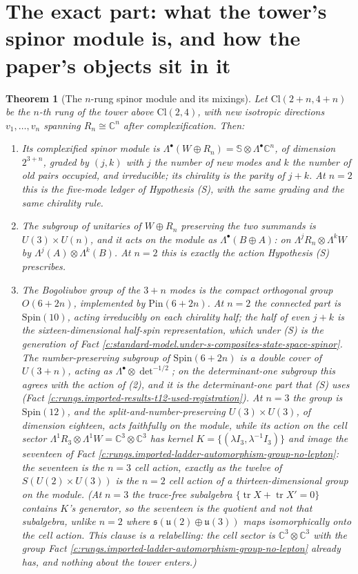 \documentclass[11pt]{article}
\newtheorem{theorem}{Theorem}[section]
\theoremstyle{definition}
\theoremstyle{plain}
\providecommand{\C}{}\renewcommand{\C}{\mathbb{C}}
\providecommand{\Cl}{}\renewcommand{\Cl}{\mathrm{Cl}}
\providecommand{\Sp}{}\renewcommand{\Sp}{\mathbb{S}}
\providecommand{\tr}{}\renewcommand{\tr}{\operatorname{tr}}
\providecommand{\uu}{}\renewcommand{\uu}{\mathfrak{u}}
\begin{document}
\section{The exact part: what the tower's spinor module is, and how the paper's objects sit in it}

\begin{theorem}[The $n$-rung spinor module and its mixings]\label{c:rungs.rung-spinor-module-mixings}
Let $\Cl(2{+}n, 4{+}n)$ be the $n$-th rung of the tower above $\Cl(2,4)$, with new isotropic directions $v_{1}, \ldots, v_{n}$ spanning $R_{n} \cong \C^{n}$ after complexification. Then:
\begin{enumerate}
\item Its complexified spinor module is $\Lambda^{\bullet}(W \oplus R_{n}) = \Sp \otimes \Lambda^{\bullet}\C^{n}$, of dimension $2^{3+n}$, graded by $(j, k)$ with $j$ the number of new modes and $k$ the number of old pairs occupied, and irreducible; its chirality is the parity of $j + k$. At $n = 2$ this is the five-mode ledger of Hypothesis (S), with the same grading and the same chirality rule.
\item The subgroup of unitaries of $W \oplus R_{n}$ preserving the two summands is $U(3) \times U(n)$, and it acts on the module as $\Lambda^{\bullet}(B \oplus A)$: on $\Lambda^{j}R_{n} \otimes \Lambda^{k}W$ by $\Lambda^{j}(A) \otimes \Lambda^{k}(B)$. At $n = 2$ this is exactly the action Hypothesis (S) prescribes.
\item The Bogoliubov group of the $3 + n$ modes is the compact orthogonal group $O(6{+}2n)$, implemented by $\mathrm{Pin}(6{+}2n)$. At $n = 2$ the connected part is $\mathrm{Spin}(10)$, acting irreducibly on each chirality half; the half of even $j + k$ is the sixteen-dimensional half-spin representation, which under (S) is the generation of Fact \ref{c:standard-model.under-s-composites-state-space-spinor}. The number-preserving subgroup of $\mathrm{Spin}(6{+}2n)$ is a double cover of $U(3{+}n)$, acting as $\Lambda^{\bullet} \otimes \det^{-1/2}$; on the determinant-one subgroup this agrees with the action of (2), and it is the determinant-one part that (S) uses (Fact \ref{c:rungs.imported-results-t12-used-registration}). At $n = 3$ the group is $\mathrm{Spin}(12)$, and the split-and-number-preserving $U(3) \times U(3)$, of dimension eighteen, acts faithfully on the module, while its action on the cell sector $\Lambda^{1}R_{3} \otimes \Lambda^{1}W = \C^{3} \otimes \C^{3}$ has kernel $K = \{(\lambda I_{3}, \lambda^{-1}I_{3})\}$ and image the seventeen of Fact \ref{c:rungs.imported-ladder-automorphism-group-no-lepton}: the seventeen is the $n = 3$ cell action, exactly as the twelve of $S(U(2) \times U(3))$ is the $n = 2$ cell action of a thirteen-dimensional group on the module. (At $n = 3$ the trace-free subalgebra $\{\tr X + \tr X' = 0\}$ contains $K$'s generator, so the seventeen is the quotient and not that subalgebra, unlike $n = 2$ where $\mathfrak{s}(\uu(2) \oplus \uu(3))$ maps isomorphically onto the cell action. This clause is a relabelling: the cell sector is $\C^{3} \otimes \C^{3}$ with the group Fact \ref{c:rungs.imported-ladder-automorphism-group-no-lepton} already has, and nothing about the tower enters.)

\end{enumerate}
\end{theorem}
\end{document}
